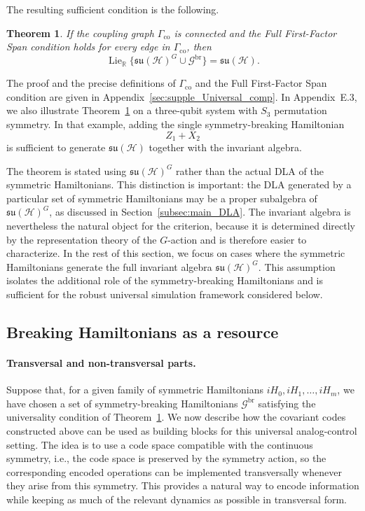 \documentclass[10pt,twocolumn,superscriptaddress,aps,amsmath,amssymb,citeautoscript,floatfix,prx]{revtex4-2}
\newcounter{alg}
\newtheorem{theorem}{Theorem}
\theoremstyle{plain}
\theoremstyle{plain}
\theoremstyle{plain}
\theoremstyle{plain}
\theoremstyle{plain}
\theoremstyle{plain}
\theoremstyle{plain}
\theoremstyle{definition}
\theoremstyle{plain}
\begin{document}
The resulting sufficient condition is the following.

\begin{theorem}\label{thm:breakers_suff_cond}
If the coupling graph $\Gamma_{\mathrm{co}}$ is connected and the Full First-Factor Span condition holds for every edge in $\Gamma_{\mathrm{co}}$, then
$$
\operatorname{Lie}_{\mathbb R}
\{\mathfrak{su}(\mathcal H)^G\cup\mathcal G^{\mathrm{br}}\}
=
\mathfrak{su}(\mathcal H).
$$
\end{theorem}

The proof and the precise definitions of $\Gamma_{\mathrm{co}}$ and the Full First-Factor Span condition are given in Appendix~\ref{sec:supple_Universal_comp}. 
In Appendix~E.3, we also illustrate Theorem~\ref{thm:breakers_suff_cond} on a three-qubit system with $S_3$ permutation symmetry. 
In that example, adding the single symmetry-breaking Hamiltonian
$$
Z_1+X_2
$$
is sufficient to generate $\mathfrak{su}(\mathcal H)$ together with the invariant algebra.

The theorem is stated using $\mathfrak{su}(\mathcal H)^G$ rather than the actual DLA of the symmetric Hamiltonians. 
This distinction is important: the DLA generated by a particular set of symmetric Hamiltonians may be a proper subalgebra of $\mathfrak{su}(\mathcal H)^G$, 
as discussed in Section~\ref{subsec:main_DLA}. The invariant algebra is nevertheless the natural object for the criterion, because it is determined directly 
by the representation theory of the $G$-action and is therefore easier to characterize. In the rest of this section, 
we focus on cases where the symmetric Hamiltonians generate the full invariant algebra $\mathfrak{su}(\mathcal H)^G$. 
This assumption isolates the additional role of the symmetry-breaking Hamiltonians and is sufficient for the robust universal simulation framework considered below.

\subsection{Breaking Hamiltonians as a resource}\label{subsec:main_H_br_resource}

\paragraph{Transversal and non-transversal parts.}

Suppose that, for a given family of symmetric Hamiltonians
${iH_0,iH_1,\ldots,iH_m}$, we have chosen a set of symmetry-breaking Hamiltonians $\mathcal G^{\mathrm{br}}$ satisfying the universality condition of Theorem~\ref{thm:breakers_suff_cond}. 
We now describe how the covariant codes constructed above can be used as building blocks for this universal analog-control setting. 
The idea is to use a code space compatible with the continuous symmetry, i.e.,
the code space is preserved by the symmetry action, so the corresponding
encoded operations can be implemented transversally whenever they arise
from this symmetry. This provides a natural way to encode information
while keeping as much of the relevant dynamics as possible in transversal
form.
\end{document}
